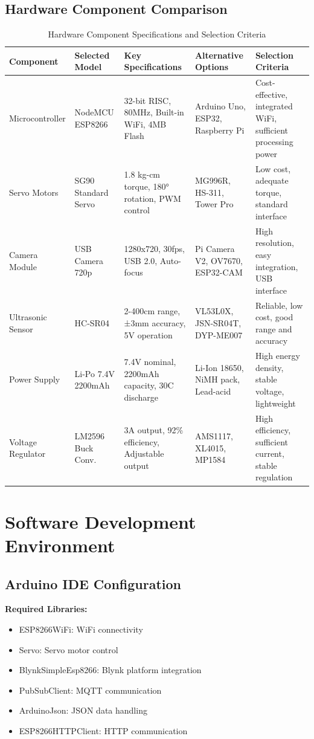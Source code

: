 \subsection{Hardware Component Comparison}

\begin{table}[h!]
\centering
\caption{Hardware Component Specifications and Selection Criteria}
\label{tab:hardware_comparison}
\begin{tabular}{|l|p{3cm}|p{3cm}|p{3cm}|p{2.5cm}|}
\hline
\textbf{Component} & \textbf{Selected Model} & \textbf{Key Specifications} & \textbf{Alternative Options} & \textbf{Selection Criteria} \\
\hline
Microcontroller & NodeMCU ESP8266 & 32-bit RISC, 80MHz, Built-in WiFi, 4MB Flash & Arduino Uno, ESP32, Raspberry Pi & Cost-effective, integrated WiFi, sufficient processing power \\
\hline
Servo Motors & SG90 Standard Servo & 1.8 kg-cm torque, 180° rotation, PWM control & MG996R, HS-311, Tower Pro & Low cost, adequate torque, standard interface \\
\hline
Camera Module & USB Camera 720p & 1280x720, 30fps, USB 2.0, Auto-focus & Pi Camera V2, OV7670, ESP32-CAM & High resolution, easy integration, USB interface \\
\hline
Ultrasonic Sensor & HC-SR04 & 2-400cm range, ±3mm accuracy, 5V operation & VL53L0X, JSN-SR04T, DYP-ME007 & Reliable, low cost, good range and accuracy \\
\hline
Power Supply & Li-Po 7.4V 2200mAh & 7.4V nominal, 2200mAh capacity, 30C discharge & Li-Ion 18650, NiMH pack, Lead-acid & High energy density, stable voltage, lightweight \\
\hline
Voltage Regulator & LM2596 Buck Conv. & 3A output, 92\% efficiency, Adjustable output & AMS1117, XL4015, MP1584 & High efficiency, sufficient current, stable regulation \\
\hline
\end{tabular}
\end{table}

\section{Software Development Environment}

\subsection{Arduino IDE Configuration}
\textbf{Required Libraries:}
\begin{itemize}
\item ESP8266WiFi: WiFi connectivity
\item Servo: Servo motor control
\item BlynkSimpleEsp8266: Blynk platform integration
\item PubSubClient: MQTT communication
\item ArduinoJson: JSON data handling
\item ESP8266HTTPClient: HTTP communication
\end{itemize}

